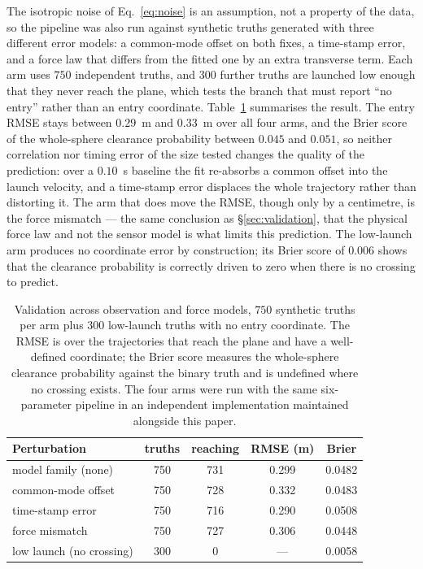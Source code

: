 The isotropic noise of Eq.~\eqref{eq:noise} is an assumption, not a property of
the data, so the pipeline was also run against synthetic truths generated with
three different error models: a common-mode offset on both fixes, a time-stamp
error, and a force law that differs from the fitted one by an extra transverse
term. Each arm uses $750$ independent truths, and $300$ further truths are
launched low enough that they never reach the plane, which tests the branch that
must report ``no entry'' rather than an entry coordinate. Table~\ref{tab:errormodels}
summarises the result. The entry RMSE stays between $0.29$~m and $0.33$~m over
all four arms, and the Brier score of the whole-sphere clearance probability
between $0.045$ and $0.051$, so neither correlation nor timing error of the size
tested changes the quality of the prediction: over a $0.10$~s baseline the fit
re-absorbs a common offset into the launch velocity, and a time-stamp error
displaces the whole trajectory rather than distorting it. The arm that does move
the RMSE, though only by a centimetre, is the force mismatch — the same
conclusion as \S\ref{sec:validation}, that the physical force law and not the
sensor model is what limits this prediction. The low-launch arm produces no
coordinate error by construction; its Brier score of $0.006$ shows that the
clearance probability is correctly driven to zero when there is no crossing to
predict.

\begin{table}[H]
  \centering
  \caption{Validation across observation and force models, $750$ synthetic
  truths per arm plus $300$ low-launch truths with no entry coordinate. The RMSE
  is over the trajectories that reach the plane and have a well-defined
  coordinate; the Brier score measures the whole-sphere clearance probability
  against the binary truth and is undefined where no crossing exists. The four
  arms were run with the same six-parameter pipeline in an independent
  implementation maintained alongside this paper.}
  \label{tab:errormodels}
  \footnotesize
  \begin{tabular}{@{}lcccc@{}}
    \toprule
    Perturbation & truths & reaching & RMSE (m) & Brier \\
    \midrule
    model family (none)      & 750 & 731 & 0.299 & 0.0482 \\
    common-mode offset       & 750 & 728 & 0.332 & 0.0483 \\
    time-stamp error         & 750 & 716 & 0.290 & 0.0508 \\
    force mismatch           & 750 & 727 & 0.306 & 0.0448 \\
    low launch (no crossing) & 300 & 0   & ---   & 0.0058 \\
    \bottomrule
  \end{tabular}
\end{table}

